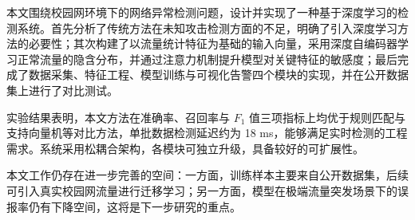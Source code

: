 
本文围绕校园网环境下的网络异常检测问题，设计并实现了一种基于深度学习的检测系统。首先分析了传统方法在未知攻击检测方面的不足，明确了引入深度学习方法的必要性；其次构建了以流量统计特征为基础的输入向量，采用深度自编码器学习正常流量的隐含分布，并通过注意力机制提升模型对关键特征的敏感度；最后完成了数据采集、特征工程、模型训练与可视化告警四个模块的实现，并在公开数据集上进行了对比测试。

实验结果表明，本文方法在准确率、召回率与 $F_1$ 值三项指标上均优于规则匹配与支持向量机等对比方法，单批数据检测延迟约为 18 ms，能够满足实时检测的工程需求。系统采用松耦合架构，各模块可独立升级，具备较好的可扩展性。

本文工作仍存在进一步完善的空间：一方面，训练样本主要来自公开数据集，后续可引入真实校园网流量进行迁移学习；另一方面，模型在极端流量突发场景下的误报率仍有下降空间，这将是下一步研究的重点。
